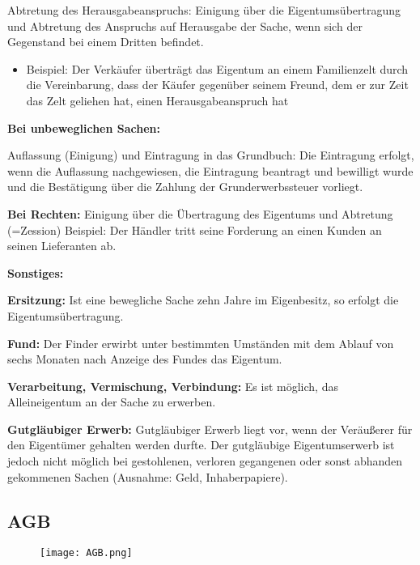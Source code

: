 \documentclass[asp1.tex]{subfiles}
\begin{document}
Abtretung des Herausgabeanspruchs:
Einigung über die Eigentumsübertragung und Abtretung des Anspruchs auf Herausgabe der Sache, wenn sich der Gegenstand bei einem Dritten befindet.
\begin{itemize}
    \item Beispiel: Der Verkäufer überträgt das Eigentum an einem Familienzelt durch die Vereinbarung, dass der Käufer gegenüber seinem Freund, dem er zur Zeit das Zelt geliehen hat, einen Herausgabeanspruch hat
\end{itemize}

\textbf{Bei unbeweglichen Sachen:}

Auflassung (Einigung) und Eintragung in das Grundbuch:
Die Eintragung erfolgt, wenn die Auflassung nachgewiesen, die Eintragung beantragt und bewilligt wurde und die Bestätigung über die Zahlung der Grunderwerbssteuer vorliegt.

\textbf{Bei Rechten:}
Einigung über die Übertragung des Eigentums und Abtretung (=Zession)
Beispiel: Der Händler tritt seine Forderung an einen Kunden an seinen Lieferanten ab.

\textbf{Sonstiges:}

\textbf{Ersitzung:}
Ist eine bewegliche Sache zehn Jahre im Eigenbesitz, so erfolgt die Eigentumsübertragung.

\textbf{Fund:}
Der Finder erwirbt unter bestimmten Umständen mit dem Ablauf von sechs Monaten nach Anzeige des Fundes das Eigentum.

\textbf{Verarbeitung, Vermischung, Verbindung:}
Es ist möglich, das Alleineigentum an der Sache zu erwerben.

\textbf{Gutgläubiger Erwerb:}
Gutgläubiger Erwerb liegt vor, wenn der Veräußerer für den Eigentümer gehalten werden durfte. Der gutgläubige Eigentumserwerb ist jedoch nicht möglich bei gestohlenen, verloren gegangenen oder
sonst abhanden gekommenen Sachen (Ausnahme: Geld, Inhaberpapiere).

\subsection{AGB}
\begin{figure}[H]
    \begin{center}
        \texttt{[image: AGB.png]}
    \end{center}
    \label{fig:AGB.png}
\end{figure}
\end{document}
